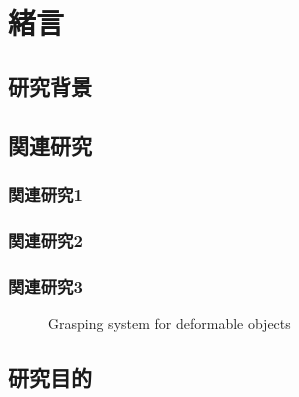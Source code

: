 \section{緒言}
\label{chap:introduction}
\subsection{研究背景}
\label{sec:back_ground}

\subsection{関連研究}
\label{sec:related_works}

\clearpage

\subsubsection{関連研究1}
\label{sec:robot_pouring_human_skill}

\subsubsection{関連研究2}
\label{sec:visual-based_pouring_motion}

\subsubsection{関連研究3}
\label{sec:tactile-based_manipulation}

\begin{figure}[h]
\centering
{}
\caption[Grasping system for deformable objects and result]{Grasping system for deformable objects ~\cite{kaboli2016tactile}}
\label{fig:kaboli2016tactile}
\end{figure}

\subsection{研究目的}
\label{sec:propose}


